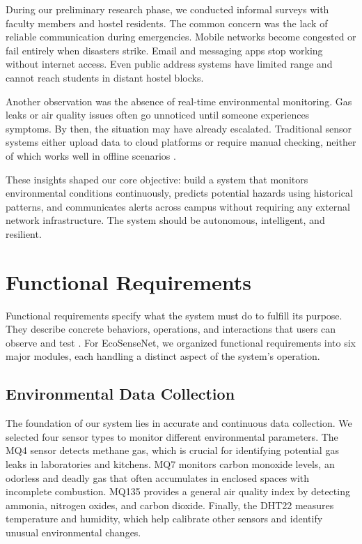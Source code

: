 During our preliminary research phase, we conducted informal surveys with faculty members and hostel residents. The common concern was the lack of reliable communication during emergencies. Mobile networks become congested or fail entirely when disasters strike. Email and messaging apps stop working without internet access. Even public address systems have limited range and cannot reach students in distant hostel blocks.

Another observation was the absence of real-time environmental monitoring. Gas leaks or air quality issues often go unnoticed until someone experiences symptoms. By then, the situation may have already escalated. Traditional sensor systems either upload data to cloud platforms or require manual checking, neither of which works well in offline scenarios \cite{minerva2015towards}.

These insights shaped our core objective: build a system that monitors environmental conditions continuously, predicts potential hazards using historical patterns, and communicates alerts across campus without requiring any external network infrastructure. The system should be autonomous, intelligent, and resilient.

\section{Functional Requirements}

Functional requirements specify what the system must do to fulfill its purpose. They describe concrete behaviors, operations, and interactions that users can observe and test \cite{nuseibeh2000requirements}. For EcoSenseNet, we organized functional requirements into six major modules, each handling a distinct aspect of the system's operation.

\subsection{Environmental Data Collection}

The foundation of our system lies in accurate and continuous data collection. We selected four sensor types to monitor different environmental parameters. The MQ4 sensor detects methane gas, which is crucial for identifying potential gas leaks in laboratories and kitchens. MQ7 monitors carbon monoxide levels, an odorless and deadly gas that often accumulates in enclosed spaces with incomplete combustion. MQ135 provides a general air quality index by detecting ammonia, nitrogen oxides, and carbon dioxide. Finally, the DHT22 measures temperature and humidity, which help calibrate other sensors and identify unusual environmental changes.


